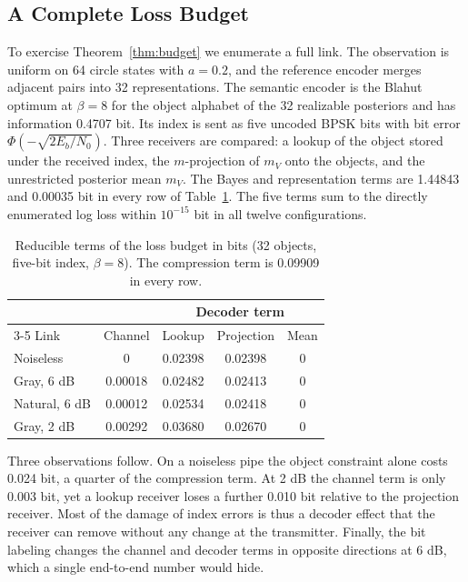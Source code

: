\documentclass[10pt,journal]{IEEEtran}
\begin{document}
\subsection{A Complete Loss Budget}
To exercise Theorem~\ref{thm:budget} we enumerate a full link. The observation is uniform on 64 circle states with $a=0.2$, and the reference encoder merges adjacent pairs into 32 representations. The semantic encoder is the Blahut optimum at $\beta=8$ for the object alphabet of the 32 realizable posteriors and has information 0.4707 bit. Its index is sent as five uncoded BPSK bits with bit error $\Phi(-\sqrt{2E_b/N_0})$. Three receivers are compared: a lookup of the object stored under the received index, the $m$-projection of $m_V$ onto the objects, and the unrestricted posterior mean $m_V$. The Bayes and representation terms are 1.44843 and 0.00035 bit in every row of Table~\ref{tab:budget}. The five terms sum to the directly enumerated log loss within $10^{-15}$ bit in all twelve configurations.
\begin{table}[t]
\caption{Reducible terms of the loss budget in bits (32 objects, five-bit index, $\beta=8$). The compression term is 0.09909 in every row.}\label{tab:budget}\centering
\begin{tabular}{lcccc}\toprule
 & & \multicolumn{3}{c}{Decoder term}\\\cmidrule(lr){3-5}
Link & Channel & Lookup & Projection & Mean\\\midrule
Noiseless & 0 & 0.02398 & 0.02398 & 0\\
Gray, 6 dB & 0.00018 & 0.02482 & 0.02413 & 0\\
Natural, 6 dB & 0.00012 & 0.02534 & 0.02418 & 0\\
Gray, 2 dB & 0.00292 & 0.03680 & 0.02670 & 0\\\bottomrule
\end{tabular}\end{table}
Three observations follow. On a noiseless pipe the object constraint alone costs 0.024 bit, a quarter of the compression term. At 2 dB the channel term is only 0.003 bit, yet a lookup receiver loses a further 0.010 bit relative to the projection receiver. Most of the damage of index errors is thus a decoder effect that the receiver can remove without any change at the transmitter. Finally, the bit labeling changes the channel and decoder terms in opposite directions at 6 dB, which a single end-to-end number would hide.
\end{document}
